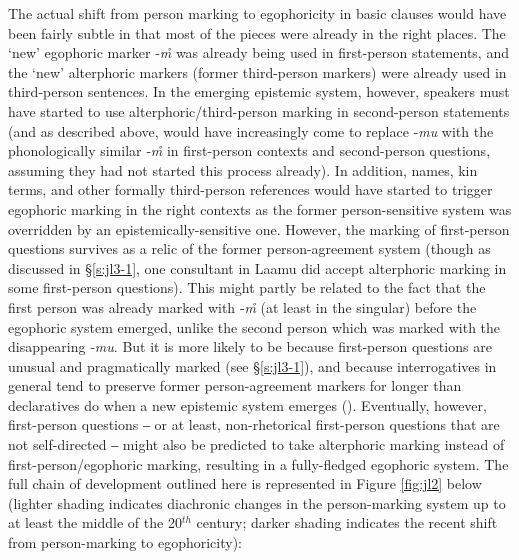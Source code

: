 \documentclass[output=paper]{langsci/langscibook}
\begin{document}
The actual shift from person marking to egophoricity in basic clauses would have been fairly subtle in that most of the pieces were already in the right places. The ‘new’ egophoric marker ‑\textit{m̊} was already being used in first-person statements, and the ‘new’ alterphoric markers (former third-person markers) were already used in third-person sentences. In the emerging epistemic system, however, speakers must have started to use alterphoric/third-person marking in sec\-ond-person statements (and as described above, would have increasingly come to replace ‑\textit{mu} with the phonologically similar ‑\textit{m̊} in first-person contexts and second-person questions, assuming they had not started this process already). In addition, names, kin terms, and other formally third-person references would have started to trigger egophoric marking in the right contexts as the former person-sensitive system was overridden by an epistemically-sensitive one. However, the marking of first-person questions survives as a relic of the former person-agreement system (though as discussed in §\ref{s:jl3-1}, one consultant in Laamu did accept alterphoric marking in some first-person questions). This might partly be related to the fact that the first person was already marked with ‑\textit{m̊} (at least in the singular) before the egophoric system emerged, unlike the second person which was marked with the disappearing ‑\textit{mu}. But it is more likely to be because first-person questions are unusual and pragmatically marked (see §\ref{s:jl3-1}), and because interrogatives in general tend to preserve former person-agreement markers for longer than declaratives do when a new epistemic system emerges (\citealt{WidmerZemp2017}). Eventually, however, first-person questions ‒ or at least, non-rhetorical first-person questions that are not self-directed ‒ might also be predicted to take alterphoric marking instead of first-person/egophoric marking, resulting in a fully-fledged egophoric system. The full chain of development outlined here is represented in Figure \ref{fig:jl2}
below (lighter shading indicates diachronic changes in the person-marking system up to at least the middle of the 20$^{th}$ century; darker shading indicates the recent shift from person-marking to egophoricity):
\end{document}
